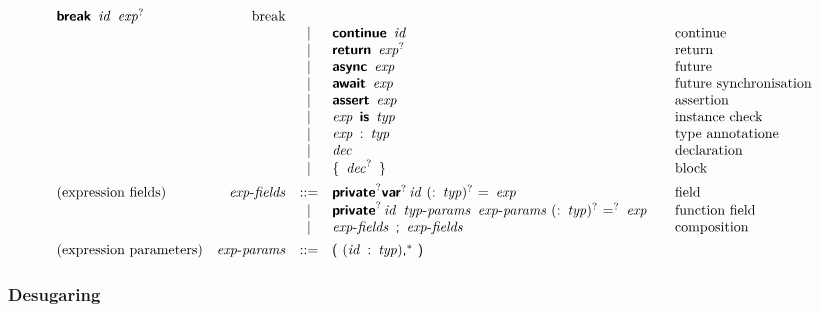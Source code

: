 $$\begin{array}{@{}lrcl@{\qquad}l}
  \KK{break}~\x{id}~\x{exp}^?
    & \text{break} \\&&|&
  \KK{continue}~\x{id}
    & \text{continue} \\&&|&
  \KK{return}~\x{exp}^?
    & \text{return} \\&&|&
  \KK{async}~\x{exp}
    & \text{future} \\&&|&
  \KK{await}~\x{exp}
    & \text{future synchronisation} \\&&|&
  \KK{assert}~\x{exp}
    & \text{assertion} \\&&|&
  \x{exp}~\KK{is}~\x{typ}
    & \text{instance check} \\&&|&
  \x{exp}~\K:~\x{typ}
    & \text{type annotatione} \\&&|&
  \x{dec}
    & \text{declaration} \\&&|&
  \K\{~\x{dec}^?~\K\}
    & \text{block} \\
[1ex]
\text{(expression fields)} & \x{exp-fields} &::=&
  \KK{private}^? \KK{var}^? \x{id}~(\K:~\x{typ})^?~\K=~\x{exp}
    & \text{field} \\&&|&
  \KK{private}^? \x{id}~\x{typ-params}~\x{exp-params}~(\K:~\x{typ})^?~\K=^?~\x{exp}
    & \text{function field} \\&&|&
  \x{exp-fields}~\K;~\x{exp-fields}
    & \text{composition} \\
[1ex]
\text{(expression parameters)} & \x{exp-params} &::=&
  \K(~(\x{id}~\K:~\x{typ})\K,^\ast~\K) \\
\end{array}
$$

\subsubsection*{Desugaring}

